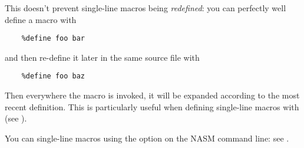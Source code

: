 This doesn't prevent single-line macros being \emph{redefined}:
you can perfectly well define a macro with

\begin{lstlisting}
	%define foo bar
\end{lstlisting}

and then re-define it later in the same source file with

\begin{lstlisting}
	%define foo baz
\end{lstlisting}

Then everywhere the macro  is invoked, it will be expanded
according to the most recent definition. This is particularly useful
when defining single-line macros with 
(see ).

You can  single-line macros using the 
option on the NASM command line: see .

